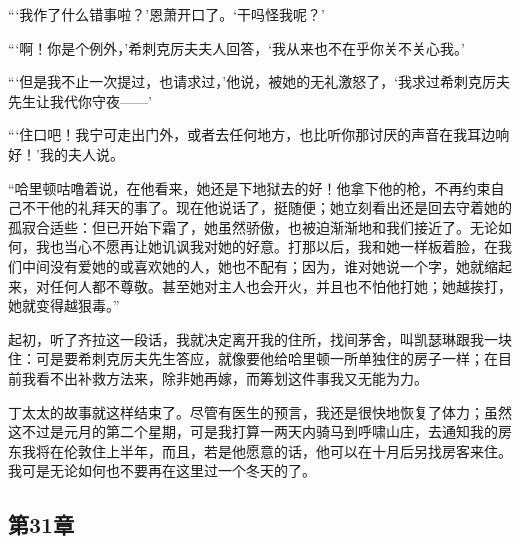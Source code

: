 \par “‘我作了什么错事啦？’恩萧开口了。‘干吗怪我呢？’
\par “‘啊！你是个例外，’希刺克厉夫夫人回答，‘我从来也不在乎你关不关心我。’
\par “‘但是我不止一次提过，也请求过，’他说，被她的无礼激怒了，‘我求过希刺克厉夫先生让我代你守夜——’
\par “‘住口吧！我宁可走出门外，或者去任何地方，也比听你那讨厌的声音在我耳边响好！’我的夫人说。
\par “哈里顿咕噜着说，在他看来，她还是下地狱去的好！他拿下他的枪，不再约束自己不干他的礼拜天的事了。现在他说话了，挺随便；她立刻看出还是回去守着她的孤寂合适些：但已开始下霜了，她虽然骄傲，也被迫渐渐地和我们接近了。无论如何，我也当心不愿再让她讥讽我对她的好意。打那以后，我和她一样板着脸，在我们中间没有爱她的或喜欢她的人，她也不配有；因为，谁对她说一个字，她就缩起来，对任何人都不尊敬。甚至她对主人也会开火，并且也不怕他打她；她越挨打，她就变得越狠毒。”
\par 起初，听了齐拉这一段话，我就决定离开我的住所，找间茅舍，叫凯瑟琳跟我一块住：可是要希刺克厉夫先生答应，就像要他给哈里顿一所单独住的房子一样；在目前我看不出补救方法来，除非她再嫁，而筹划这件事我又无能为力。
\par 丁太太的故事就这样结束了。尽管有医生的预言，我还是很快地恢复了体力；虽然这不过是元月的第二个星期，可是我打算一两天内骑马到呼啸山庄，去通知我的房东我将在伦敦住上半年，而且，若是他愿意的话，他可以在十月后另找房客来住。我可是无论如何也不要再在这里过一个冬天的了。


\subsection{第31章}

